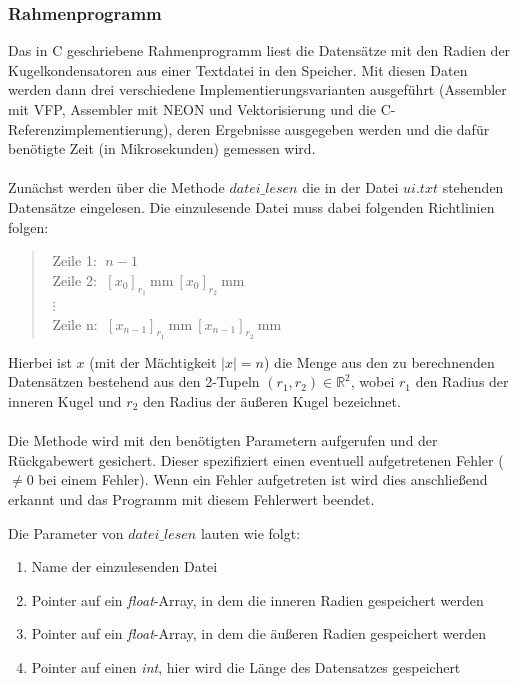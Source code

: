 \documentclass[11pt]{scrartcl}
\begin{document}
\subsubsection{Rahmenprogramm}
Das in C geschriebene Rahmenprogramm liest die Datensätze mit den Radien der Kugelkondensatoren aus einer Textdatei in den Speicher.
Mit diesen Daten werden dann drei verschiedene Implementierungsvarianten ausgeführt (Assembler mit VFP, Assembler mit NEON und Vektorisierung und die C-Referenzimplementierung), deren Ergebnisse ausgegeben werden und die dafür benötigte Zeit (in Mikrosekunden) gemessen wird.
\\\\
Zunächst werden über die Methode \emph{$datei\_lesen$} die in der Datei \emph{$ui.txt$} stehenden Datensätze eingelesen. Die einzulesende Datei muss dabei folgenden Richtlinien folgen:
\begin{verse}
$ $ Zeile 1: $\; n-1 $ \\
$ $ Zeile 2: $\; [x_{0}]_{r_{1}} \: $mm$ \: [x_{0}]_{r_{2}} \: $mm$ $ \\
$ $ $\vdots $\\
$ $ Zeile n: $\; [x_{n-1}]_{r_{1}} \: $mm$ \: [x_{n-1}]_{r_{2}}\: $mm$ $
\end{verse}
Hierbei ist $x$ (mit der Mächtigkeit $\vert x \vert = n$) die Menge aus den zu berechnenden Datensätzen bestehend aus den 2-Tupeln $(r_{1},r_{2})\in \mathbb{R}^{2} $, wobei $r_{1}$ den Radius der inneren Kugel und $r_{2}$ den Radius der äußeren Kugel bezeichnet.
\\\\
Die Methode wird mit den benötigten Parametern aufgerufen und der Rückgabewert gesichert. Dieser spezifiziert einen eventuell aufgetretenen Fehler ($\neq 0$ bei einem Fehler). Wenn ein Fehler aufgetreten ist wird dies anschließend erkannt und das Programm mit diesem Fehlerwert beendet.

Die Parameter von \emph{$datei\_lesen$} lauten wie folgt:
\begin{enumerate}
\item Name der einzulesenden Datei
\item Pointer auf ein \emph{float}-Array, in dem die inneren Radien gespeichert werden
\item Pointer auf ein \emph{float}-Array, in dem die äußeren Radien gespeichert werden
\item Pointer auf einen \emph{int}, hier wird die Länge des Datensatzes gespeichert
\end{enumerate}
\end{document}
